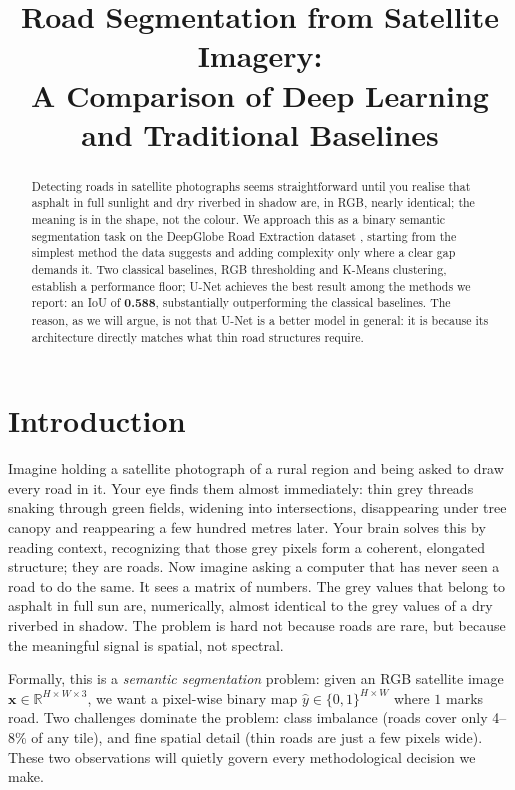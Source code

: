 \documentclass[conference]{IEEEtran}
\title{Road Segmentation from Satellite Imagery:\\
A Comparison of Deep Learning and Traditional Baselines}
\author{
  \IEEEauthorblockN{William Wayn, Maysa Xavier}
  \IEEEauthorblockA{COMP11069 -- Data Mining and Visualisation\\
  University of the West of Scotland\\
  2025/2026}
}
\begin{document}
\maketitle

\begin{abstract}
Detecting roads in satellite photographs seems straightforward until you realise that asphalt
in full sunlight and dry riverbed in shadow are, in RGB, nearly identical; the meaning is in
the shape, not the colour. We approach this as a binary semantic segmentation task on the
DeepGlobe Road Extraction dataset \cite{demir2018deepglobe}, starting from the simplest method
the data suggests and adding complexity only where a clear gap demands it. Two classical baselines,
RGB thresholding and K-Means clustering, establish a performance floor; U-Net
\cite{ronneberger2015unet} achieves the best result among the methods we report: an IoU of
\textbf{0.588}, substantially outperforming the classical baselines. The reason, as
we will argue, is not that U-Net is a better model in general: it is because its architecture
directly matches what thin road structures require.
\end{abstract}

\section{Introduction}
\label{sec:intro}

Imagine holding a satellite photograph of a rural region and being asked to draw every road in it.
Your eye finds them almost immediately: thin grey threads snaking through green fields, widening
into intersections, disappearing under tree canopy and reappearing a few hundred metres later.
Your brain solves this by reading context, recognizing that those grey pixels form a coherent, elongated
structure; they are roads.
Now imagine asking a computer that has never seen a road to do the same.
It sees a matrix of numbers.
The grey values that belong to asphalt in full sun are, numerically, almost identical to the grey
values of a dry riverbed in shadow.
The problem is hard not because roads are rare, but because the meaningful signal is spatial,
not spectral.

Formally, this is a \textit{semantic segmentation} problem: given an RGB satellite image
$\mathbf{x} \in \mathbb{R}^{H \times W \times 3}$, we want a pixel-wise binary map
$\hat{y} \in \{0,1\}^{H \times W}$ where $1$ marks road.
Two challenges dominate the problem: class imbalance (roads cover only 4--8\% of any tile),
and fine spatial detail (thin roads are just a few pixels wide).
These two observations will quietly govern every methodological decision we make.
\end{document}
